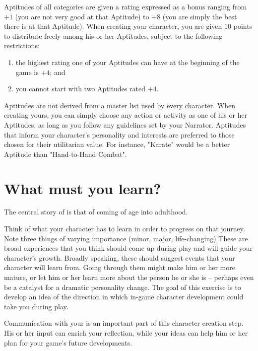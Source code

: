 Aptitudes of all categories are given a rating expressed as a bonus ranging from $+1$ (you are not very good
at that Aptitude) to $+8$ (you are simply the best there is at that Aptitude). When creating your character, you
are given $10$ points to distribute freely among his or her Aptitudes, subject to the following restrictions:
\begin{enumerate}
\item the highest rating one of your Aptitudes can have at the beginning of the game is $+4$; and
\item you cannot start with two Aptitudes rated $+4$.
\end{enumerate}

Aptitudes are not derived from a master list used by every character. When creating yours, you can simply
choose any action or activity as one of his or her Aptitudes, as long as you follow any guidelines set by
your Narrator. Aptitudes that inform your character's personality and interests are preferred to those chosen
for their utilitarian value. For instance, "Karate" would be a better Aptitude than "Hand-to-Hand Combat".

\section{What must you learn?}

The central story of \ParadoxSpaceRPG is that of coming of age into adulthood.

Think of what your character has to learn in order to progress on that journey.
Note three things of varying importance (minor, major, life-changing)
These are broad experiences that you think should come up during play and will guide your character's growth.
Broadly speaking, these should suggest events that your character will learn from. Going through them might
make him or her more mature, or let him or her learn more about the person he or she is -- perhaps even be
a catalyst for a dramatic personality change. The goal of this exercise is to develop an idea of the direction
in which in-game character development could take you during play.

Communication with your \GM is an important part of this character creation step. His or her input can enrich
your reflection, while your ideas can help him or her plan for your game's future developments.
